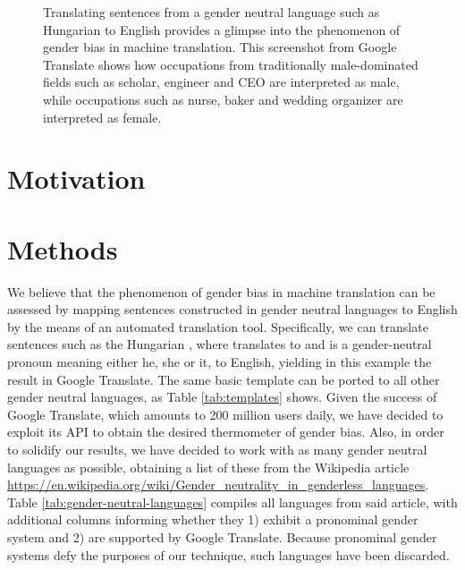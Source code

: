 \documentclass{article}
\begin{document}
\begin{figure}[h]
	\centering
	\label{fig:screenshot-gtranslate-hungarian}
	\caption{Translating sentences from a gender neutral language such as Hungarian to English provides a glimpse into the phenomenon of gender bias in machine translation. This screenshot from Google Translate shows how occupations from traditionally male-dominated fields such as scholar, engineer and CEO are interpreted as male, while occupations such as nurse, baker and wedding organizer are interpreted as female.}
\end{figure}

\section{Motivation}

\section{Methods}

We believe that the phenomenon of gender bias in machine translation can be assessed by mapping sentences constructed in gender neutral languages to English by the means of an automated translation tool. Specifically, we can translate sentences such as the Hungarian , where  translates to  and  is a gender-neutral pronoun meaning either he, she or it, to English, yielding in this example the result  in Google Translate. The same basic template can be ported to all other gender neutral languages, as Table \ref{tab:templates} shows. Given the success of Google Translate, which amounts to 200 million users daily, we have decided to exploit its API to obtain the desired thermometer of gender bias. Also, in order to solidify our results, we have decided to work with as many gender neutral languages as possible, obtaining a list of these from the Wikipedia article \url{https://en.wikipedia.org/wiki/Gender_neutrality_in_genderless_languages}. Table \ref{tab:gender-neutral-languages} compiles all languages from said article, with additional columns informing whether they 1) exhibit a pronominal gender system and 2) are supported by Google Translate. Because pronominal gender systems defy the purposes of our technique, such languages have been discarded.
\end{document}

